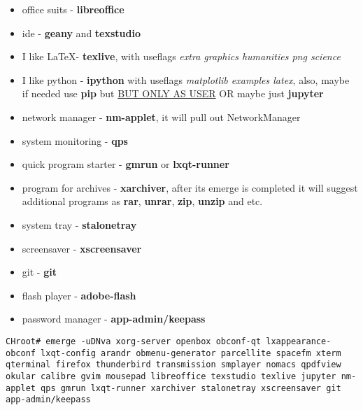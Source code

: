 \documentclass[10pt,a4paper]{article}
\begin{document}
\begin{itemize}
                        \item office suits - \textbf{libreoffice}
                        \item ide - \textbf{geany} and \textbf{texstudio}
                        \item I like \LaTeX - \textbf{texlive}, with useflags \textit{extra graphics humanities png science}
                        \item I like python - \textbf{ipython} with useflags \textit{matplotlib examples latex}, also, maybe if needed use \textbf{pip} but \href{https://wiki.gentoo.org/wiki/Pip#Invocation}{BUT ONLY AS USER} OR maybe just \textbf{jupyter}
                        \item network manager - \textbf{nm-applet}, it will pull out NetworkManager
                        \item system monitoring - \textbf{qps}
                        \item quick program starter - \textbf{gmrun} or \textbf{lxqt-runner}
                        \item program for archives - \textbf{xarchiver}, after its emerge is completed it will suggest additional programs as \textbf{rar}, \textbf{unrar}, \textbf{zip}, \textbf{unzip} and etc.
                        \item system tray - \textbf{stalonetray}
                        \item screensaver - \textbf{xscreensaver}
                        \item git - \textbf{git}
                        \item flash player - \textbf{adobe-flash}
                        \item password manager - \textbf{app-admin/keepass}
                    \end{itemize}
                
                    \begin{lstlisting}[style=BashInputCHRoot]
 CHroot# emerge -uDNva xorg-server openbox obconf-qt lxappearance-obconf lxqt-config arandr obmenu-generator parcellite spacefm xterm qterminal firefox thunderbird transmission smplayer nomacs qpdfview okular calibre gvim mousepad libreoffice texstudio texlive jupyter nm-applet qps gmrun lxqt-runner xarchiver stalonetray xscreensaver git app-admin/keepass
                    \end{lstlisting}
                
\end{document}
